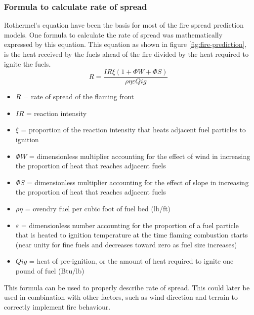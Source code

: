 \subsubsection{Formula to calculate rate of spread}
Rothermel’s equation have been the basis for most of the fire spread prediction models. One formula to calculate the rate of spread was mathematically expressed by this equation. This equation as shown in figure \ref{fig:fire-prediction}, is the heat received by the fuels ahead of the fire divided by the heat required to ignite the fuels.
\begin{equation}
R=\dfrac{IR \xi(1 + \Phi W + \Phi S)}{\rho \eta \varepsilon  Qig}
\label{eq:fire-spreadd}
\end{equation}
\begin{itemize}
\item $ R $ = rate of spread of the flaming front
\item $IR$ = reaction intensity
\item $\xi$ = proportion of the reaction intensity that heats adjacent fuel particles to ignition
\item $\Phi W$ = dimensionless multiplier accounting for the effect of wind in increasing the proportion of heat that reaches adjacent fuels
\item $\Phi S$ = dimensionless multiplier accounting for the effect of slope in increasing the proportion of heat that reaches adjacent fuels
\item $\rho \eta$ = ovendry fuel per cubic foot of fuel bed (lb/ft)
\item $\varepsilon$ = dimensionless number accounting for the proportion of a fuel particle that is heated to ignition temperature at the time flaming combustion starts (near unity for fine fuels and decreases toward zero as fuel size increases)
\item $Qig$ = heat of pre-ignition, or the amount of heat required to ignite one pound of fuel (Btu/lb)
\end{itemize}
This formula can be used to properly describe rate of spread. This could later be used in combination with other factors, such as wind direction and terrain to correctly implement fire behaviour.
